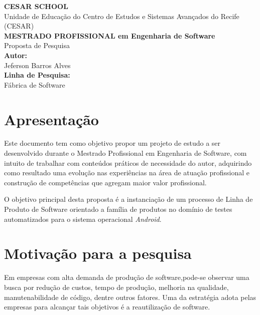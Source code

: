 \documentclass[12pt,a4paper]{article}
\begin{document}
\begin{titlepage}
\begin{flushright}
{\bf CESAR SCHOOL}\\
{Unidade de Educação do Centro de Estudos e Sistemas Avançados do Recife}
{(CESAR)}\\[3.5cm]
{\bf \large MESTRADO PROFISSIONAL em Engenharia de Software}\\
{Proposta de Pesquisa}\\[2.5cm] 
{\bf Autor:}\\
{Jeferson Barros Alves}\\[0.8cm]
{\bf Linha de Pesquisa:}\\
{Fábrica de Software}\\[0.8cm]
\end{flushright}
\end{titlepage}
\renewcommand{\cftsecleader}{\cftdotfill{\cftdotsep}} %
\tableofcontents
{}
\newpage

\section{Apresentação}
Este documento tem como objetivo propor um projeto de estudo a ser desenvolvido durante o Mestrado Profissional em Engenharia de Software, com intuito de trabalhar com conteúdos práticos de necessidade do autor, adquirindo como resultado uma evolução nas experiências na área de atuação profissional e construção de competências que agregam maior valor profissional.

O objetivo principal desta proposta é a instanciação de um processo de Linha de Produto de Software orientado a família de produtos no domínio de testes automatizados para o sistema operacional \textit{Android}.

\section{Motivação para a pesquisa}
Em empresas com alta demanda de produção de software,pode-se observar uma busca por redução de custos, tempo de produção, melhoria na qualidade, manutenabilidade de código, dentre outros fatores. Uma da estratégia adota pelas empresas para alcançar tais objetivos é a reautilização de software.
\end{document}
